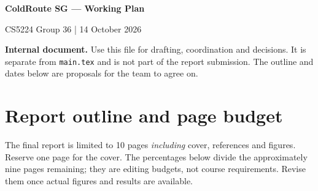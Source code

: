 \documentclass[11pt,a4paper]{article}
\begin{document}
\begin{center}
  {\LARGE\bfseries ColdRoute SG --- Working Plan\par}
  \vspace{0.3em}
  {\large CS5224 Group 36 | 14 October 2026\par}
\end{center}
\noindent\textbf{Internal document.} Use this file for drafting, coordination and decisions. It is separate from \texttt{main.tex} and is not part of the report submission. The outline and dates below are proposals for the team to agree on.

\section{Report outline and page budget}
The final report is limited to 10 pages \emph{including} cover, references and figures. Reserve one page for the cover. The percentages below divide the approximately nine pages remaining; they are editing budgets, not course requirements. Revise them once actual figures and results are available.
\end{document}
